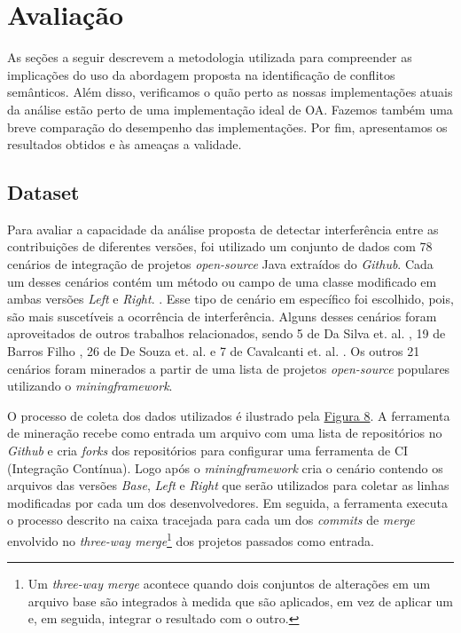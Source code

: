 \section{Avaliação}

As seções a seguir descrevem a metodologia utilizada para compreender as implicações do uso da abordagem proposta na identificação de conflitos semânticos. Além disso, verificamos o quão perto as nossas implementações atuais da análise estão perto de uma implementação ideal de OA. Fazemos também uma breve comparação do desempenho das implementações. Por fim, apresentamos os resultados obtidos e às ameaças a validade.

\subsection{Dataset}
Para avaliar a capacidade da análise proposta de detectar interferência entre as contribuições de diferentes versões, foi utilizado um conjunto de dados com 78 cenários de integração de projetos \emph{open-source} Java extraídos do \emph{Github}. Cada um desses cenários contém um método ou campo de uma classe modificado em ambas versões \emph{Left} e \emph{Right}. . Esse tipo de cenário em específico foi escolhido, pois, são mais suscetíveis a ocorrência de interferência. Alguns desses cenários foram aproveitados de outros trabalhos relacionados, sendo 5 de Da Silva et. al. \cite{LeusonSilva2020}, 19 de Barros Filho  \cite{InformationFlowRoberto}, 26 de De Souza et. al. \cite{10.1145/958160.958177} e 7 de Cavalcanti et. al. \cite{10.1109/ASE.2019.00097}. Os outros 21 cenários foram minerados a partir de uma lista de projetos \emph{open-source} populares utilizando o \emph{miningframework}. 

O processo de coleta dos dados utilizados é ilustrado pela \hyperref[fig:mineracao]{Figura 8}. A ferramenta de mineração recebe como entrada um arquivo com uma lista de repositórios no \emph{Github} e cria \emph{forks} dos repositórios para configurar uma ferramenta de CI (Integração Contínua). Logo após o \emph{miningframework} cria o cenário contendo os arquivos das versões \emph{Base}, \emph{Left} e \emph{Right} que serão utilizados para coletar as linhas modificadas por cada um dos desenvolvedores. Em seguida, a ferramenta executa o processo descrito na caixa tracejada para cada um dos \emph{commits} de \emph{merge} envolvido no \emph{three-way merge}\footnote{Um  \emph{three-way merge} acontece quando dois conjuntos de alterações em um arquivo base são integrados à medida que são aplicados, em vez de aplicar um e, em seguida, integrar o resultado com o outro.} dos projetos passados como entrada. 

